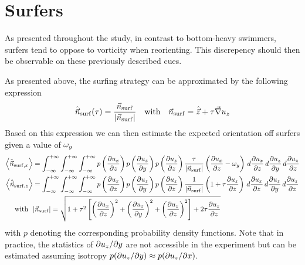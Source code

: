 \section{Surfers}

As presented throughout the study, in contrast to bottom-heavy swimmers, surfers tend to oppose to vorticity when reorienting.
This discrepency should then be observable on these previously described cues.

As presented above, the surfing strategy can be approximated by the following expression
\begin{equation}
	\hat{\vec{n}}_{\mathrm{surf}}(\tau) = \frac{\vec{n}_{\mathrm{surf}}}{\lvert\vec{n}_{\mathrm{surf}}\rvert} \quad \text{with} \quad \vec{n}_{\mathrm{surf}} = \hat{\vec{z}} + \tau \vec{\nabla} u_z
\end{equation}
Based on this expression we can then estimate the expected orientation off surfers given a value of $\omega_y$
\begin{subequations}
	\begin{align}
		\left\langle \hat{\vec{n}}_{\mathrm{surf}, x} \right\rangle &= \int_{-\infty}^{+\infty} \int_{-\infty}^{+\infty} \int_{-\infty}^{+\infty} p \left(\frac{\partial u_x}{\partial z} \right) p \left( \frac{\partial u_z}{\partial y} \right) p \left( \frac{\partial u_z}{\partial z} \right) \frac{\tau}{\lvert\vec{n}_{\mathrm{surf}}\rvert} \left( \frac{\partial u_x}{\partial z} - \omega_y \right) \, d\frac{\partial u_x}{\partial z} \, d\frac{\partial u_z}{\partial y} \, d\frac{\partial u_z}{\partial z}\\
		\left\langle \hat{\vec{n}}_{\mathrm{surf}, z} \right\rangle &= \int_{-\infty}^{+\infty} \int_{-\infty}^{+\infty} \int_{-\infty}^{+\infty} p \left(\frac{\partial u_x}{\partial z} \right) p \left( \frac{\partial u_z}{\partial y} \right) p \left( \frac{\partial u_z}{\partial z} \right) \frac{1}{\lvert\vec{n}_{\mathrm{surf}}\rvert} \left( 1 + \tau \frac{\partial u_z}{\partial z} \right) \, d\frac{\partial u_x}{\partial z} \, d\frac{\partial u_z}{\partial y} \, d\frac{\partial u_z}{\partial z}\\
		\text{with} ~~ &\lvert\vec{n}_{\mathrm{surf}}\rvert = \sqrt{1 + \tau^2 \left[ \left( \frac{\partial u_x}{\partial z} \right)^2 + \left( \frac{\partial u_z}{\partial y} \right)^2 + \left( \frac{\partial u_z}{\partial z} \right)^2 \right] + 2 \tau \frac{\partial u_z}{\partial z}}
	\end{align}
\end{subequations}
with $p$ denoting the corresponding probability density functions.
Note that in practice, the statistics of $\partial u_z / \partial y$ are not accessible in the experiment but can be estimated assuming isotropy $p(\partial u_z / \partial y) \approx p(\partial u_z / \partial x)$.

